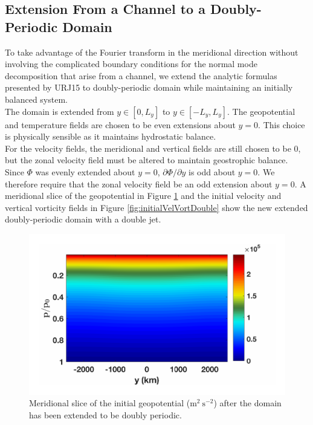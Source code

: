 \subsection{Extension From a Channel to a Doubly-Periodic Domain}
To take advantage of the Fourier transform in the meridional direction without involving the complicated boundary conditions for the normal mode decomposition that arise from a channel, we extend the analytic formulas presented by URJ15 to doubly-periodic domain while maintaining an initially balanced system.\\

The domain is extended from $y \in [0, L_y]$ to $y \in [-L_y, L_y]$. The geopotential and temperature fields are chosen to be even extensions about $y=0$. This choice is physically sensible as it maintains hydrostatic balance.\\

For the velocity fields, the meridional and vertical fields are still chosen to be 0, but the zonal velocity field must be altered to maintain geostrophic balance. Since $\Phi$ was evenly extended about $y=0$, $\partial \Phi/\partial y$ is odd about $y = 0$. We therefore require that the zonal velocity field be an odd extension about $y = 0$. A meridional slice of the geopotential in Figure \ref{fig:initialGeoDouble} and the initial velocity and vertical vorticity fields in Figure \ref{fig:initialVelVortDouble} show the new extended doubly-periodic domain with a double jet.\\

\begin{figure}[H]
\includegraphics[scale=1]{Chapter3/img/initialGeoDouble}
\caption{Meridional slice of the initial geopotential ($\text{m}^2 ~\text{s}^{-2}$) after the domain has been extended to be doubly periodic.}
\label{fig:initialGeoDouble}
\end{figure}

